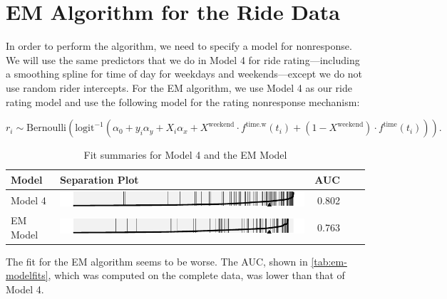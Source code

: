 \documentclass[12pt,twoside]{reedthesis}
\begin{document}
  \section{EM Algorithm for the Ride
  Data}\label{em-algorithm-for-the-ride-data}
  
  In order to perform the algorithm, we need to specify a model for
  nonresponse. We will use the same predictors that we do in Model 4 for
  ride rating---including a smoothing spline for time of day for weekdays
  and weekends---except we do not use random rider intercepts. For the EM
  algorithm, we use Model 4 as our ride rating model and use the following
  model for the rating nonresponse mechanism:
  
  \begin{equation}
  r_i \sim \text{Bernoulli}(\text{logit}^{-1} (\alpha_0 + y_i \alpha_y + 
  X_i \alpha_x + X^\text{weekend} \cdot f^\text{time.w} (t_i) +
  (1 - X^\text{weekend}) \cdot f^\text{time} (t_i))).
  \end{equation}
  
  \begin{table}[htb]
  \centering
  \caption{Fit summaries for Model 4 and the EM Model\label{tab:em-modelfits}}
  \begin{tabular}{lm{4in}rrr}
  \toprule
  \textbf{Model} & \textbf{Separation Plot} & \textbf{AUC}\footnotemark\\
  \midrule
  Model 4 & \includegraphics{figure/model4-sep.pdf}
  & 0.802\\
  EM Model & \includegraphics{figure/em-separation-plot.pdf}
  & 0.763\\
  \bottomrule
  \end{tabular}
  \end{table}
  
  The fit for the EM algorithm seems to be worse. The AUC, shown in
  \autoref{tab:em-modelfits}, which was computed on the complete data, was
  lower than that of Model 4.
  
\end{document}
